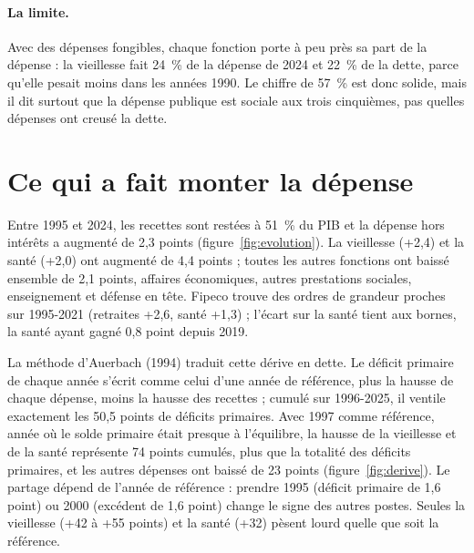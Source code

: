 \documentclass[11pt,a4paper]{article}
\begin{document}
\paragraph{La limite.} Avec des dépenses fongibles, chaque fonction porte à peu près sa part de la
dépense : la vieillesse fait 24~\% de la dépense de 2024 et 22~\% de la dette, parce qu'elle
pesait moins dans les années 1990. Le chiffre de 57~\% est donc solide, mais il dit surtout que la
dépense publique est sociale aux trois cinquièmes, pas quelles dépenses ont creusé la dette.

\section{Ce qui a fait monter la dépense}\label{sec:derive}


Entre 1995 et 2024, les recettes sont restées à 51~\% du PIB et la dépense hors intérêts a augmenté
de 2,3 points (figure~\ref{fig:evolution}). La vieillesse (+2,4) et la santé (+2,0) ont augmenté de
4,4 points ; toutes les autres fonctions ont baissé ensemble de 2,1 points, affaires économiques,
autres prestations sociales, enseignement et défense en tête. Fipeco trouve des ordres de grandeur
proches sur 1995-2021 (retraites +2,6, santé +1,3) ; l'écart sur la santé tient aux bornes, la
santé ayant gagné 0,8 point depuis 2019.

La méthode d'Auerbach (1994) traduit cette dérive en dette. Le déficit primaire de chaque année
s'écrit comme celui d'une année de référence, plus la hausse de chaque dépense, moins la hausse des
recettes ; cumulé sur 1996-2025, il ventile exactement les 50,5 points de déficits primaires. Avec
1997 comme référence, année où le solde primaire était presque à l'équilibre, la hausse de la
vieillesse et de la santé représente 74 points cumulés, plus que la totalité des déficits
primaires, et les autres dépenses ont baissé de 23 points (figure~\ref{fig:derive}). Le partage
dépend de l'année de référence : prendre 1995 (déficit primaire de 1,6 point) ou 2000 (excédent de
1,6 point) change le signe des autres postes. Seules la vieillesse (+42 à +55 points) et la santé
(+32) pèsent lourd quelle que soit la référence.

\end{document}
